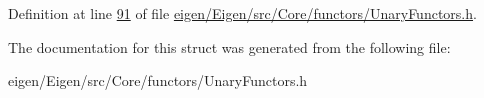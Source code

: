 Definition at line \hyperlink{eigen_2_eigen_2src_2_core_2functors_2_unary_functors_8h_source_l00091}{91} of file \hyperlink{eigen_2_eigen_2src_2_core_2functors_2_unary_functors_8h_source}{eigen/\+Eigen/src/\+Core/functors/\+Unary\+Functors.\+h}.



The documentation for this struct was generated from the following file\+:\begin{DoxyCompactItemize}
\item 
eigen/\+Eigen/src/\+Core/functors/\+Unary\+Functors.\+h\end{DoxyCompactItemize}
